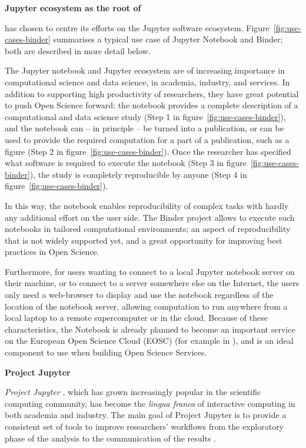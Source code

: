 \noindent\textbf{Jupyter ecosystem as the root of \TheProject}


\TheProject has chosen to centre its efforts on the Jupyter software
ecosystem. Figure~\ref{fig:use-cases-binder} summarises a typical use
case of Jupyter Notebook and Binder; both are described in more detail
below.

The Jupyter notebook and Jupyter ecosystem are of increasing
importance in computational science and data science, in academia,
industry, and services. In addition to supporting high productivity of
researchers, they have great potential to push Open Science forward:
the notebook provides a complete description of a computational and
data science study (Step 1 in figure~\ref{fig:use-cases-binder}), and the notebook can -- in principle -- be turned
into a publication, or can be used to provide the required computation
for a part of a publication, such as a figure
(Step 2 in figure~\ref{fig:use-cases-binder}). Once the researcher has
specified what software is required to execute the notebook (Step 3
in figure~\ref{fig:use-cases-binder}), the study is completely
reproducible by anyone (Step 4 in figure~\ref{fig:use-cases-binder}).

In this way, the notebook enables reproducibility of complex tasks
with hardly any additional effort on the user side.
The Binder project allows to execute such notebooks in
tailored computational environments; an aspect of reproducibility that
is not widely supported yet,
and a great opportunity for improving best practices in Open Science.

Furthermore, for users wanting to connect
to a local Jupyter notebook server on their machine, or to connect to
a server somewhere else on the Internet, the users only need a
web-browser to display and use the notebook regardless of the location
of the notebook server,
allowing computation to run anywhere from a local laptop to a remote supercomputer or in the cloud.
Because of these characteristics,
the Notebook is already planned to become an
important service on the European Open Science Cloud (EOSC) (for
example in \cite{panosc}),
and is an ideal component to use when building Open Science Services.

\medskip\noindent\textbf{Project Jupyter}

\emph{Project Jupyter} \cite{Jupyter}, which has grown increasingly popular in the scientific
computing community, has become the \emph{lingua franca} of interactive
computing in both academia and industry. The main goal of Project Jupyter
is to provide a consistent set of tools to improve researchers'
workflows from the exploratory phase of the analysis to the communication
of the results \cite{Kluyver2016}.

